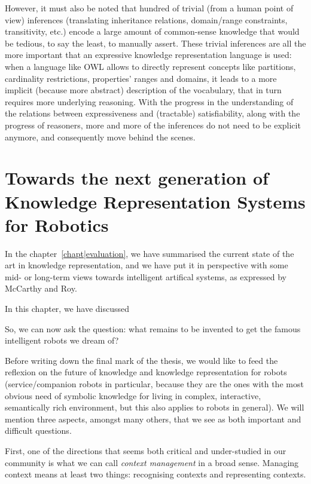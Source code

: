 However, it must also be noted that hundred of trivial (from a human point of
view) inferences (translating inheritance relations, domain/range constraints,
transitivity, etc.) encode a large amount of common-sense knowledge that would
be tedious, to say the least, to manually assert. These trivial inferences are
all the more important that an expressive knowledge representation language is
used: when a language like OWL allows to directly represent concepts like
partitions, cardinality restrictions, properties' ranges and domains, it leads
to a more implicit (because more abstract) description of the vocabulary, that
in turn requires more underlying reasoning. With the progress in the
understanding of the relations between expressiveness and (tractable)
satisfiability, along with the progress of reasoners, more and more of the
inferences do not need to be explicit anymore, and consequently move behind the
scenes.

\section{Towards the next generation of Knowledge Representation Systems for Robotics}
\label{sect|perspectives}

In the chapter~\ref{chapt|evaluation}, we have summarised the current state of
the art in knowledge representation, and we have put it in perspective with
some mid- or long-term views towards intelligent artifical systems, as
expressed by McCarthy and Roy.

In this chapter, we have discussed

So, we can now ask the question: what remains to be invented to get the famous
intelligent robots we dream of?

Before writing down the final mark of the thesis, we would like to feed the
reflexion on the future of knowledge and knowledge representation for robots
(service/companion robots in particular, because they are the ones with the
most obvious need of symbolic knowledge for living in complex, interactive,
semantically rich environment, but this also applies to robots in general). We
will mention three aspects, amongst many others, that we see as both important
and difficult questions.

First, one of the directions that seems both critical and under-studied in our
community is what we can call \emph{context management} in a broad sense.
Managing context means at least two things: recognising contexts and
representing contexts.

